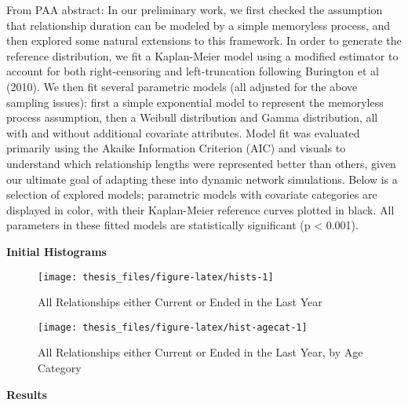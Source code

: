 \documentclass [11pt, proquest] {uwthesis}[2015/03/03]
\begin{document}
From PAA abstract: In our preliminary work, we first checked the
assumption that relationship duration can be modeled by a simple
memoryless process, and then explored some natural extensions to this
framework. In order to generate the reference distribution, we fit a
Kaplan-Meier model using a modified estimator to account for both
right-censoring and left-truncation following Burington et al (2010). We
then fit several parametric models (all adjusted for the above sampling
issues): first a simple exponential model to represent the memoryless
process assumption, then a Weibull distribution and Gamma distribution,
all with and without additional covariate attributes. Model fit was
evaluated primarily using the Akaike Information Criterion (AIC) and
visuals to understand which relationship lengths were represented better
than others, given our ultimate goal of adapting these into dynamic
network simulations. Below is a selection of explored models; parametric
models with covariate categories are displayed in color, with their
Kaplan-Meier reference curves plotted in black. All parameters in these
fitted models are statistically significant (p \textless{} 0.001).

\textbf{Initial Histograms}
\begin{figure}

{\centering \texttt{[image: thesis\_files/figure-latex/hists-1]} 

}

\caption{All Relationships either Current or Ended in the Last Year}\label{fig:hists}
\end{figure}
\begin{figure}

{\centering \texttt{[image: thesis\_files/figure-latex/hist-agecat-1]} 

}

\caption{All Relationships either Current or Ended in the Last Year, by Age Category}\label{fig:hist-agecat}
\end{figure}
\textbf{Results}
\end{document}
